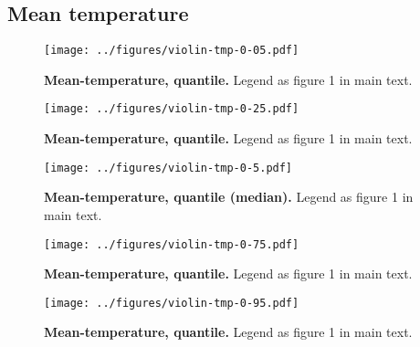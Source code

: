 \documentclass[12pt]{report}
\begin{document}
\subsection{Mean temperature}
\begin{figure}[h!]
  \begin{center}
    \texttt{[image: ../figures/violin-tmp-0-05.pdf]}
  \end{center}
  \caption{\textbf{Mean-temperature,  quantile.} Legend as
    figure 1 in main text.}
\end{figure}
\begin{figure}[h!]
  \begin{center}
    \texttt{[image: ../figures/violin-tmp-0-25.pdf]}
  \end{center}
  \caption{\textbf{Mean-temperature,  quantile.} Legend as
    figure 1 in main text.}
\end{figure}
\begin{figure}[h!]
  \begin{center}
    \texttt{[image: ../figures/violin-tmp-0-5.pdf]}
  \end{center}
  \caption{\textbf{Mean-temperature,  quantile (median).}
    Legend as figure 1 in main text.}
\end{figure}
\begin{figure}[h!]
  \begin{center}
    \texttt{[image: ../figures/violin-tmp-0-75.pdf]}
  \end{center}
  \caption{\textbf{Mean-temperature,  quantile.} Legend as
    figure 1 in main text.}
\end{figure}
\begin{figure}[h!]
  \begin{center}
    \texttt{[image: ../figures/violin-tmp-0-95.pdf]}
  \end{center}
  \caption{\textbf{Mean-temperature,  quantile.} Legend as
    figure 1 in main text.}
\end{figure}

\clearpage
\end{document}
